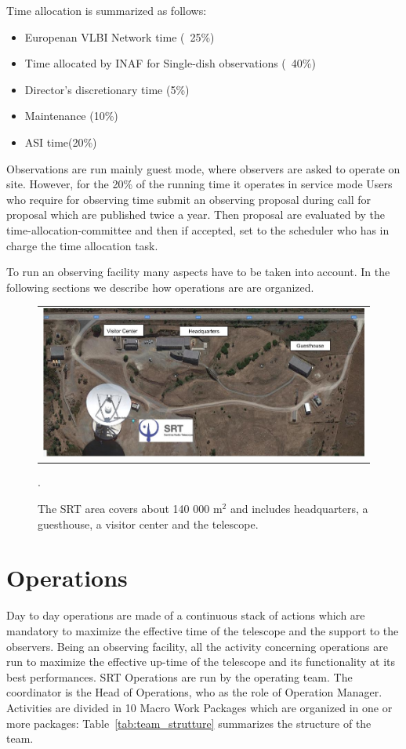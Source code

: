 \documentclass[a4paper]{spie}  %
\begin{document}
Time allocation is summarized as follows:
\begin{itemize}
    \item Europenan VLBI Network time (~25\%)
    \item Time allocated by INAF for Single-dish observations (~40\%)
    \item Director's discretionary time (5\%)
    \item Maintenance (10\%)
    \item ASI time(20\%)
\end{itemize}

Observations are run mainly guest mode, where observers are asked to operate on site. However, for the 20\% of the running time it operates in service mode 
Users who require for observing time submit an observing proposal during call for proposal which are published twice a year. Then proposal are evaluated by the time-allocation-committee and then if accepted, set to the scheduler who has in charge the time allocation task. 

To run an observing facility many aspects have to be taken into account. In the following sections we describe how operations are are organized. 

\begin{figure} [hbt!]
   \begin{center}
   \begin{tabular}{c} 
   \includegraphics[width=1.0\textwidth]{srt_site.png}
	\end{tabular}
	\end{center}
   \caption[example] 
   { \label{fig:srt_site} 
The SRT area covers about 140 000 m$^2$ and includes headquarters, a guesthouse, a visitor center and the telescope.  }.
   \end{figure} 

\section{Operations}
Day to day operations are made of a continuous stack of actions which are mandatory  to maximize the effective time of the telescope and the support to the observers. Being an observing facility, all the activity concerning operations  are run to maximize the effective up-time of the telescope and its functionality at its best performances.
SRT Operations are run by the operating team. The coordinator is the Head of Operations, who as the role of Operation Manager. 
Activities are divided in 10 Macro Work Packages which are organized in one or more packages:
Table~\ref{tab:team_strutture} summarizes the structure of the team. 
\end{document}
